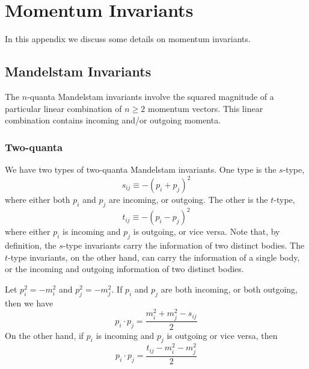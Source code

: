 \chapter{Momentum Invariants\label{AppMomInva}}
In this appendix we discuss some details on momentum invariants.
\section{Mandelstam Invariants}
The $n$-quanta Mandelstam invariants involve the squared magnitude of a particular linear combination of $n \geq 2$ momentum vectors. This linear combination contains incoming and/or outgoing momenta.
\subsection{Two-quanta}
We have two types of two-quanta Mandelstam invariants. One type is the $s$-type,
\begin{equation}
	s_{ij} \equiv - (p_{i} + p_{j})^{2} \label{sTypeMand}
\end{equation}
where either both $p_{i}$ and $p_{j}$ are incoming, or outgoing. The other is the $t$-type,
\begin{equation}
	t_{ij} \equiv - (p_{i} - p_{j})^{2} \label{tTypeMand}
\end{equation}
where either $p_{i}$ is incoming and $p_{j}$ is outgoing, or vice versa. Note that, by definition, the $s$-type invariants carry the information of two distinct bodies. The $t$-type invariants, on the other hand, can carry the information of a single body, or the incoming and outgoing information of two distinct bodies.

Let $p_{i}^{2} = -m_{i}^{2}$ and $p_{j}^{2} = -m_{j}^{2}$. If $p_{i}$ and $p_{j}$ are both incoming, or both outgoing, then we have
\begin{equation}
	p_{i} \cdot p_{j} = \frac{m_{i}^{2} + m_{j}^{2} - s_{ij}}{2}
\end{equation}
On the other hand, if $p_{i}$ is incoming and $p_{j}$ is outgoing or vice versa, then
\begin{equation}
	p_{i} \cdot p_{j} = \frac{t_{ij} - m_{i}^{2} - m_{j}^{2}}{2}
\end{equation}
